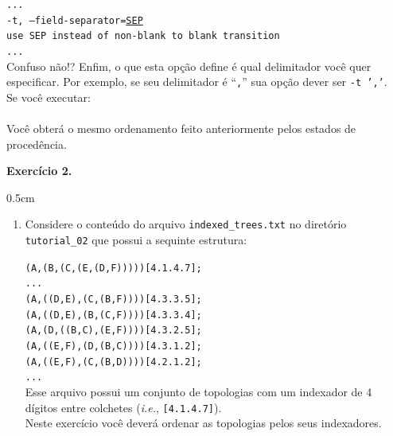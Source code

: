 \begin{refsection}
\texttt{...}\\
\texttt{-t, --field-separator=\underline{SEP}}\\
\indent\texttt{use SEP instead of non-blank to blank transition}\\
\texttt{...}\\

Confuso não!? Enfim, o que esta opção define é qual delimitador você quer especificar. Por exemplo, se seu delimitador é ``\texttt{,}'' sua opção dever ser \texttt{-t ','}.\\

Se você executar:\\
\\

Você obterá o mesmo ordenamento feito anteriormente pelos estados de procedência.\\

\begin{blackBlock}{\textbf{Exercício 2.}}\label{tut2:ex:2.\arabic{ex}}

\begin {myindentpar}{0.5cm}
\begin{enumerate}[\itshape i.]

 \item{Considere o conteúdo do arquivo \texttt{indexed\_trees.txt} no diretório \texttt{tutorial\_02} que possui a sequinte estrutura:}

\texttt{(A,(B,(C,(E,(D,F)))))[4.1.4.7];}\\
\texttt{...}\\
\texttt{(A,((D,E),(C,(B,F))))[4.3.3.5];}\\
\texttt{(A,((D,E),(B,(C,F))))[4.3.3.4];}\\
\texttt{(A,(D,((B,C),(E,F))))[4.3.2.5];}\\
\texttt{(A,((E,F),(D,(B,C))))[4.3.1.2];}\\
\texttt{(A,((E,F),(C,(B,D))))[4.2.1.2];}\\
\texttt{...}\\

Esse arquivo possui um conjunto de topologias com um indexador de 4 dígitos entre colchetes (\textit{i.e.}, \texttt{[4.1.4.7]}).\\
Neste exercício você deverá ordenar as topologias pelos seus indexadores.

\end{enumerate}
\end{myindentpar}


\end{blackBlock}
\end{refsection}
